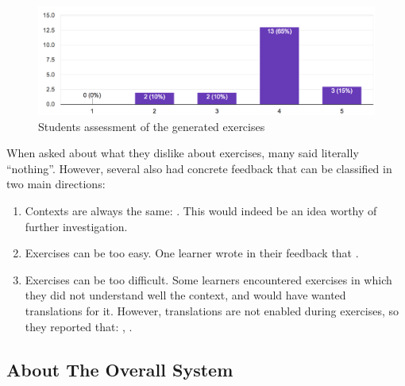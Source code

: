  \begin{figure}[h!]
    \centering
      \includegraphics[width=0.8\columnwidth]{figures/opinions/exercises_rating}
      \caption{Students assessment  of the generated exercises}
      \label{fig:ex_rating}
    \end{figure}

When asked about what they dislike about exercises, many said literally ``nothing''. However, several also had concrete feedback that can be classified in two main directions: 

\begin{enumerate}

  \item Contexts are always the same: . This would indeed be an idea worthy of further investigation.

	\item Exercises can be too easy. One learner wrote in their feedback that . 

  \item Exercises can be too difficult. Some learners encountered exercises in which they did not understand well the context, and would have wanted translations for it. However, translations are not enabled during exercises, so they reported that: , . 
	
\end{enumerate}



\subsection{About The Overall System}

